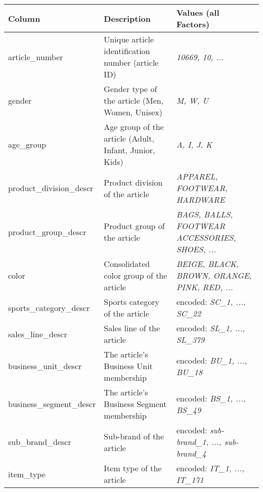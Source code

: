\begin{table}[H]
\setlength\arrayrulewidth{1pt}  
\centering
\begin{adjustbox}{max width=\textwidth}
\begin{tabular}{|l|l|l|}
\hline
\rowcolor{Gray}
\textbf{Column}           & \textbf{Description}                                   & \textbf{Values (all Factors)}                 \\ \hline
article\_number           & Unique article identification number (article ID)      & \textit{10669, 10, ...}                                \\ \hline
gender                    & Gender type of the article (Men, Women, Unisex)        & \textit{M, W, U}                                       \\ \hline
age\_group                & Age group of the article (Adult, Infant, Junior, Kids) & \textit{A, I, J, K}                                    \\ \hline
product\_division\_descr  & Product division of the article                        & \textit{APPAREL, FOOTWEAR, HARDWARE}                   \\ \hline
product\_group\_descr     & Product group of the article                           & \textit{BAGS, BALLS, FOOTWEAR ACCESSORIES, SHOES, ...} \\ \hline
color                     & Consolidated color group of the article                & \textit{BEIGE, BLACK, BROWN, ORANGE, PINK, RED, ... }  \\ \hline
sports\_category\_descr   & Sports category of the article                         & encoded: \textit{SC\_1, ..., SC\_22 }                  \\ \hline
sales\_line\_descr        & Sales line of the article                              & encoded: \textit{SL\_1, ..., SL\_379 }                 \\ \hline
business\_unit\_descr     & The article's Business Unit membership                 & encoded:\textit{ BU\_1, ..., BU\_18   }                \\ \hline
business\_segment\_descr  & The article's Business Segment membership              & encoded: \textit{BS\_1, ..., BS\_49  }                 \\ \hline
sub\_brand\_descr         & Sub-brand of the article                               & encoded: \textit{sub-brand\_1, ..., sub-brand\_4 }     \\ \hline
item\_type                & Item type of the article                               & encoded: \textit{IT\_1, ..., IT\_171 }                 \\ \hline

\end{tabular}
\end{adjustbox}
\end{table}
